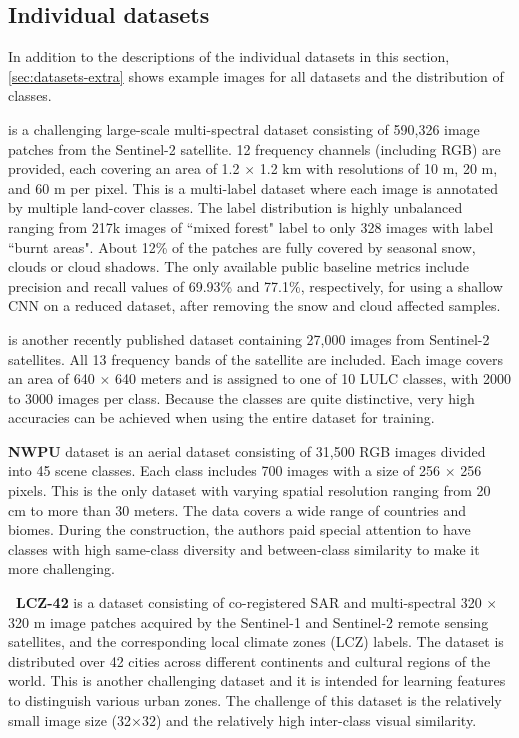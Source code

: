  

\subsection{Individual datasets}
In addition to the descriptions of the individual datasets in this section, \cref{sec:datasets-extra} shows example images for all datasets and the distribution of classes.



{\bf \ben{}} \citep{sumbul2019:bigearthnet} is a challenging large-scale multi-spectral dataset consisting of 590,326 image patches from the Sentinel-2 satellite. 12 frequency channels (including RGB) are provided, each covering an area of 1.2 $\times$ 1.2 km with resolutions of 10 m, 20 m, and 60 m per pixel. This is a multi-label dataset where each image is annotated by multiple land-cover classes. The label distribution is highly unbalanced ranging from 217k images of ``mixed forest" label to only 328 images with label ``burnt areas". About 12\% of the patches are fully covered by seasonal snow, clouds or cloud shadows. The only available public baseline metrics include precision and recall values of 69.93\% and 77.1\%, respectively, for using a shallow CNN on a reduced dataset, after removing the snow and cloud affected samples.



{\bf \eur{}} \citep{helber2019:eurosat} is another recently published dataset containing 27,000 images from Sentinel-2 satellites. All 13 frequency bands of the satellite are included. Each image covers an area of 640 $\times$ 640 meters and is assigned to one of 10 LULC classes, with 2000 to 3000 images per class. Because the classes are quite distinctive, very high accuracies can be achieved when using the entire dataset for training.



{\bf NWPU \res{}} \citep{cheng2017:resisc45} dataset is an aerial dataset consisting of 31,500 RGB images divided into 45 scene classes. Each class includes 700 images with a size of 256 $\times$ 256 pixels. This is the only dataset with varying spatial resolution ranging from 20 cm to more than 30 meters. The data covers a wide range of countries and biomes. During the construction, the authors paid special attention to have classes with high same-class diversity and between-class similarity to make it more challenging.



{\bf \sos\ LCZ-42} \citep{zhu2018:so2sat} is a dataset consisting of co-registered SAR and multi-spectral 320 $\times$ 320 m image patches acquired by the Sentinel-1 and Sentinel-2 remote sensing satellites, and the corresponding local climate zones (LCZ) \citep{stewart12:lcz} labels. The dataset is distributed over 42 cities across different continents and cultural regions of the world. This is another challenging dataset and it is intended for learning features to distinguish various urban zones. The challenge of this dataset is the relatively small image size (32$\times$32) and the relatively high inter-class visual similarity.



